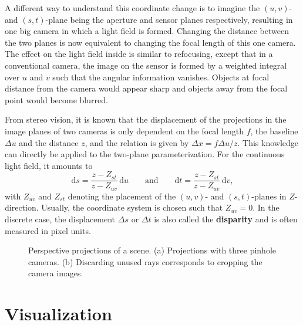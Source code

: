 A different way to understand this coordinate change is to imagine the $(u, v)$- and $(s, t)$-plane being the aperture and sensor planes respectively, resulting in one big camera in which a light field is formed.
Changing the distance between the two planes is now equivalent to changing the focal length of this one camera.
The effect on the light field inside is similar to refocusing, except that in a conventional camera, the image on the sensor is formed by a weighted integral over $u$ and $v$ such that the angular information vanishes.
Objects at focal distance from the camera would appear sharp and objects away from the focal point would become blurred.


From stereo vision, it is known that the displacement of the projections in the image planes of two cameras is only dependent on the focal length $f$, the baseline $\Delta u$ and the distance $z$, and the relation is given by $\Delta x = f \Delta u / z$.
This knowledge can directly be applied to the two-plane parameterization. 
For the continuous light field, it amounts to
\begin{equation}
	\textrm{d}s = \frac{z - Z_{st}}{z - Z_{uv}} \, \textrm{d}u 
	\qquad
	\text{and} 
	\qquad
	\textrm{d}t = \frac{z - Z_{st}}{z - Z_{uv}} \, \textrm{d}v,
\end{equation}
with $Z_{uv}$ and $Z_{st}$ denoting the placement of the $(u, v)$- and \mbox{$(s, t)$-planes} in \mbox{$Z$-direction}.
Usually, the coordinate system is chosen such that $Z_{uv} = 0$.
In the discrete case, the displacement $\Delta s$ or $\Delta t$ is also called the \textbf{disparity} and is often measured in pixel units.

\begin{figure}[tb]
	\subfigure[]{
		\centering
		
		\label{fig:ShiftedPerspectiveProjection}
	}
	\hfill
	\subfigure[]{
		\centering
		
		\label{fig:RectifiedPerspectiveProjection}
	}
	\caption{Perspective projections of a scene. 
			 (a) Projections with three pinhole cameras. 
			 (b) Discarding unused rays corresponds to cropping the camera images.}
\end{figure}

\section{Visualization}
\label{sec:Visualization}


